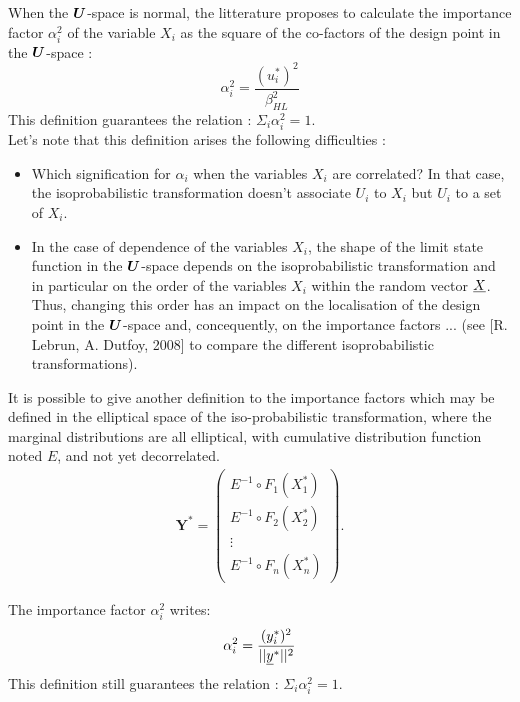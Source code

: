 {  When the ${\boldsymbol{U}}$-space is normal, the litterature proposes to calculate the importance factor $\alpha_i^2$ of the variable $X_i$ as the square of the co-factors of the design point in the ${\boldsymbol{U}}$-space :
  \begin{equation}\label{def1}
    \alpha_i^2 = \displaystyle \frac{(u_i^{*})^2}{\beta_{HL}^2}
  \end{equation}
  This definition guarantees the relation : $ \Sigma_i \alpha_i^2 = 1$.\\

  Let's note that this definition arises the following difficulties :
  \begin{itemize}
  \item Which signification for $\alpha_i$ when the variables $X_i$ are correlated? In that case, the isoprobabilistic transformation doesn't associate $U_i$ to $X_i$ but $U_i$ to a set of $X_i$.
  \item In the case of dependence of the variables $X_i$, the shape of the limit state function in the ${\boldsymbol{U}}$-space depends on the isoprobabilistic transformation and in particular on the order of the variables $X_i$ within the random vector ${\underline{X}}$. Thus, changing this order has an impact on the localisation of the design point in the ${\boldsymbol{U}}$-space and, concequently, on the importance factors ... (see [R. Lebrun, A. Dutfoy, 2008] to compare the different isoprobabilistic transformations).
  \end{itemize}

  It is possible to give another definition to the importance factors which may be defined in the elliptical space of the iso-probabilistic transformation, where the marginal distributions are all elliptical, with cumulative distribution function noted $E$, and not yet decorrelated.\\
  \begin{eqnarray}
    \boldsymbol{Y}^* =  \left(
    \begin{array}{c}
      E^{-1}\circ F_1(X_1^*) \\
      E^{-1}\circ F_2(X_2^*) \\
      \vdots \\
      E^{-1}\circ F_n(X_n^*)
    \end{array}
    \right).\label{varY10}
  \end{eqnarray}

  The importance factor $\alpha_i^2$ writes:
  \begin{equation}\label{def2}
    \alpha_i^2 = \displaystyle \frac{(y_i^{*})^2}{||{\underline{y}}^{*}||^2}
  \end{equation}
  This definition still guarantees the relation : $ \Sigma_i \alpha_i^2 = 1$.

}

